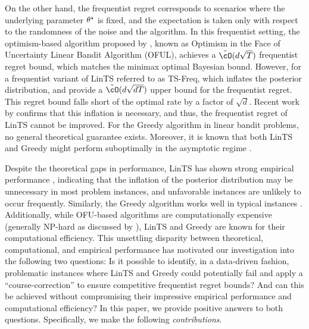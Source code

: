 On the other hand, the frequentist regret corresponds to scenarios where the underlying parameter $\theta^\star$ is fixed, and the expectation is taken only with respect to the randomness of the noise and the algorithm. In this frequentist setting, the optimism-based algorithm proposed by \cite{abbasi2011improved}, known as Optimism in the Face of Uncertainty Linear Bandit Algorithm (OFUL), achieves a $\tilde{\cO}(d\sqrt{T})$ frequentist regret bound, which matches the minimax optimal Bayesian bound. However, for a frequentist variant of LinTS referred to as TS-Freq, which inflates the posterior distribution, \cite{agrawal2013thompson} and \cite{abeille2017linear} provide a $\tilde{\cO}(d\sqrt{dT})$ upper bound for the frequentist regret. This regret bound falls short of the optimal rate by a factor of $\sqrt{d}$. Recent work by \citet{hamidi2020frequentist} confirms that this inflation is necessary, and thus, the frequentist regret of LinTS cannot be improved. For the Greedy algorithm in linear bandit problems,  no general theoretical guarantee exists. Moreover, it is known that both LinTS and Greedy might perform suboptimally in the asymptotic regime \citep{lattimore2017end}.

Despite the theoretical gaps in performance, LinTS has shown strong empirical performance \citep{russo2018tutorial}, indicating that the inflation of the posterior distribution may be unnecessary in most problem instances, and unfavorable instances are unlikely to occur frequently. Similarly, the Greedy algorithm works well in typical instances 
\citep{bietti2021contextual}. Additionally, while OFU-based algorithms are computationally expensive (generally NP-hard as discussed by \cite{dani2008stochastic,russo2014learning,agrawal2019recent}), LinTS and Greedy are known for their computational efficiency. This unsettling disparity between theoretical, computational, and empirical performance has motivated our investigation into the following two questions:  Is it possible to identify, in a data-driven fashion,  problematic instances where LinTS and Greedy could potentially fail and apply a ``course-correction'' to ensure competitive frequentist regret bounds? And can this be achieved without compromising their impressive empirical performance and computational efficiency?
%
In this paper, we provide positive answers to both questions. Specifically, we make the following \emph{contributions}. 

